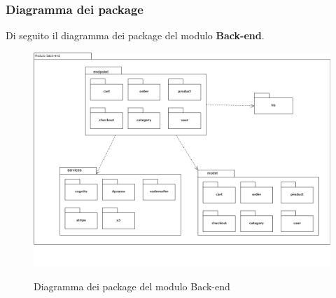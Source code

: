 \subsubsection{Diagramma dei package}
Di seguito il diagramma dei package del modulo \textbf{Back-end}.

\vspace{1cm}

\begin{figure}[H]
\centering
\includegraphics[scale=0.43]{res/Architettura/Backend/img/package-back-end.png}\\
\caption{Diagramma dei package del modulo Back-end}
\end{figure}